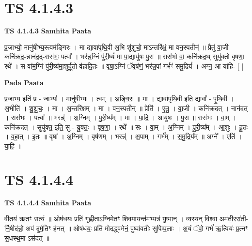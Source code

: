 \documentclass[17pt]{extarticle}
\begin{document}

\section{ TS 4.1.4.3 }

\textbf{TS 4.1.4.3 } \newline
\textbf{Samhita Paata} \newline

प्र॒जाभ्यो॒ मानु॑षीभ्य॒स्त्वम॑ङ्गिरः । मा द्यावा॑पृथि॒वी अ॒भि शू॑शुचो॒ माऽन्तरि॑क्षं॒ मा वन॒स्पतीन्॑ ॥ प्रैतु॑ वा॒जी कनि॑क्रद॒-न्नान॑द॒द्-रास॑भः॒ पत्वा᳚ । भर॑न्न॒ग्निं पु॑री॒ष्यं॑ मा पा॒द्यायु॑षः पु॒रा ॥ रास॑भो वां॒ कनि॑क्रद॒थ् सुयु॑क्तो वृषणा॒ रथे᳚ । स वा॑म॒ग्निं पु॑री॒ष्य॑मा॒शुर्दू॒तो व॑हादि॒तः ॥ वृषा॒ऽग्निं ॅवृष॑णं॒ भर॑न्न॒पां गर्भꣳ॑ समु॒द्रियं᳚ । अग्न॒ आ या॑हि- [  ] \newline

\textbf{Pada Paata} \newline

प्र॒जाभ्य॒ इति॑ प्र - जाभ्यः॑ । मानु॑षीभ्यः । त्वम् । अ॒ङ्गि॒रः॒ ॥ मा । द्यावा॑पृथि॒वी इति॒ द्यावा᳚ - पृ॒थि॒वी । अ॒भीति॑ । शू॒शु॒चः॒ । मा । अ॒न्तरि॑क्षम् । मा । वन॒स्पतीन्॑ ॥ प्रेति॑ । ए॒तु॒ । वा॒जी । कनि॑क्रदत् । नान॑दत् । रास॑भः । पत्वा᳚ ॥ भरन्न्॑ । अ॒ग्निम् । पु॒री॒ष्य᳚म् । मा । पा॒दि॒ । आयु॑षः । पु॒रा ॥ रास॑भः । वा॒म् । कनि॑क्रदत् । सुयु॑क्त॒ इति॒ सु - यु॒क्तः॒ । वृ॒ष॒णा॒ । रथे᳚ ॥ सः । वा॒म् । अ॒ग्निम् । पु॒री॒ष्य᳚म् । आ॒शुः । दू॒तः । व॒हा॒त् । इ॒तः ॥ वृषा᳚ । अ॒ग्निम् । वृष॑णम् । भरन्न्॑ । अ॒पाम् । गर्भ᳚म् । स॒मु॒द्रिय᳚म् ॥ अग्ने᳚ । एति॑ । या॒हि॒ ।  \newline





\section{ TS 4.1.4.4 }

\textbf{TS 4.1.4.4 } \newline
\textbf{Samhita Paata} \newline

वी॒तय॑ ऋ॒तꣳ स॒त्यं ॥ ओष॑धयः॒ प्रति॑ गृह्णीता॒ऽग्निमे॒तꣳ शि॒वमा॒यन्त॑म॒भ्यत्र॑ यु॒ष्मान् । व्यस्य॒न् विश्वा॒ अम॑ती॒ररा॑ती-र्नि॒षीद॑न्नो॒ अप॑ दुर्म॒तिꣳ ह॑नत् ॥ ओष॑धयः॒ प्रति॑ मोदद्ध्वमेनं॒ पुष्पा॑वतीः सुपिप्प॒लाः । अ॒यं ॅवो॒ गर्भ॑ ऋ॒त्वियः॑ प्र॒त्नꣳ स॒धस्थ॒मा ऽस॑दत् ॥ \newline
\end{document}

